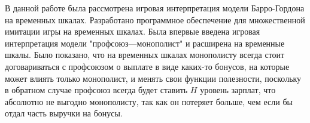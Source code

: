 В данной работе была рассмотрена игровая интерпретация модели Барро-Гордона на временных шкалах. Разработано  программное обеспечение для множественной имитации игры на временных шкалах. Была впервые введена игровая интерпретация модели "профсоюз---монополист" и расширена на временные шкалы. Было показано, что на временных шкалах монополисту всегда стоит договариваться с профсоюзом о выплате в виде каких-то бонусов, на которые может влиять только монополист, и менять свои функции полезности, поскольку в обратном случае профсоюз всегда будет ставить $H$ уровень зарплат, что абсолютно не выгодно монополисту, так как он потеряет больше, чем если бы отдал часть выручки на бонусы.